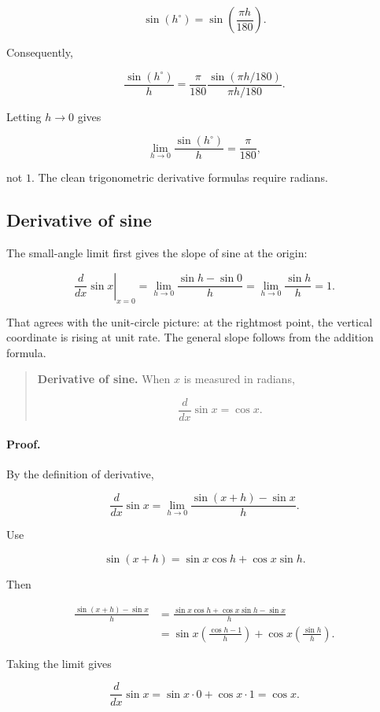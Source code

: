 \[
\sin(h^\circ)
=
\sin\left(\frac{\pi h}{180}\right).
\]

Consequently,

\[
\frac{\sin(h^\circ)}{h}
=
\frac{\pi}{180}
\frac{\sin(\pi h/180)}{\pi h/180}.
\]

Letting \(h\to0\) gives

\[
\lim_{h\to0}\frac{\sin(h^\circ)}{h}
=
\frac{\pi}{180},
\]

not \(1\). The clean trigonometric derivative formulas require radians.


\subsection{Derivative of sine}
\label{subsec:deriv-sine}

The small-angle limit first gives the slope of sine at the origin:

\[
\left.\frac{d}{dx}\sin x\right|_{x=0}
=
\lim_{h\to0}\frac{\sin h-\sin0}{h}
=
\lim_{h\to0}\frac{\sin h}{h}
=
1.
\]

That agrees with the unit-circle picture: at the rightmost point, the vertical
coordinate is rising at unit rate. The general slope follows from the addition formula.

\begin{quote}
\textbf{Derivative of sine.}
When \(x\) is measured in radians,

\[
\boxed{
\frac{d}{dx}\sin x=\cos x.
}
\]
\end{quote}

\paragraph{Proof.}
By the definition of derivative,

\[
\frac{d}{dx}\sin x
=
\lim_{h\to0}
\frac{\sin(x+h)-\sin x}{h}.
\]

Use

\[
\sin(x+h)=\sin x\cos h+\cos x\sin h.
\]

Then

\begin{align*}
\frac{\sin(x+h)-\sin x}{h}
&=
\frac{\sin x\cos h+\cos x\sin h-\sin x}{h}
\\
&=
\sin x\left(\frac{\cos h-1}{h}\right)
+
\cos x\left(\frac{\sin h}{h}\right).
\end{align*}

Taking the limit gives

\[
\frac{d}{dx}\sin x
=
\sin x\cdot0+\cos x\cdot1
=
\cos x.
\]

